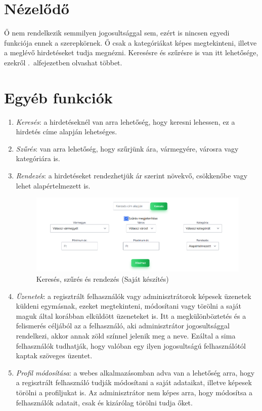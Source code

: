 \documentclass[]{thesis-ekf}
\theoremstyle{definition}
\theoremstyle{remark}
\begin{document}
	\section{Nézelődő}
		Ő nem rendelkezik semmilyen jogosultsággal sem, ezért is nincsen egyedi funkciója ennek a szerepkörnek. Ő csak a kategóriákat képes megtekinteni, illetve a meglévő hirdetéseket tudja megnézni. Keresésre és szűrésre is van itt lehetősége, ezekről .~alfejezetben olvashat többet.
	\section{Egyéb funkciók}\label{egyeb-funkciok}
		\begin{enumerate}
			\item \emph{Keresés}: a hirdetéseknél van arra lehetőség, hogy keresni lehessen, ez a hirdetés címe alapján lehetséges.
			\item \emph{Szűrés}: van arra lehetőség, hogy szűrjünk ára, vármegyére, városra vagy kategóriára is.
			\item \emph{Rendezés}: a hirdetéseket rendezhetjük ár szerint növekvő, csökkenőbe vagy lehet alapértelmezett is.
				\begin{figure}[ht!]
				\centering
				\includegraphics[width=13cm]{./felhasznaloi/kereses-szures}
				\caption{Keresés, szűrés és rendezés (Saját készítés)} 
				\label{kereses-szures-muvelet}
			\end{figure}
			\item \emph{Üzenetek}: a regisztrált felhasználók vagy adminisztrátorok képesek üzenetek küldeni egymásnak, ezeket megtekinteni, módosítani vagy törölni a saját maguk által korábban elküldött üzeneteket is. Itt a megkülönböztetés és a felismerés céljából az a felhasználó, aki adminisztrátor jogosultsággal rendelkezi, akkor annak zöld színnel jelenik meg a neve. Ezáltal a sima felhasználók tudhatják, hogy valóban egy ilyen jogosultságú felhasználótól kaptak szöveges üzentet.
			\item \emph{Profil módosítása}: a webes alkalmazásomban adva van a lehetőség arra, hogy a regisztrált felhasználó tudják módosítani a saját adataikat, illetve képesek törölni a profiljukat is. Az adminisztrátor nem képes arra, hogy módosítsa a felhasználók adatait, csak és kizárólag törölni tudja őket.

\end{enumerate}
\end{document}
